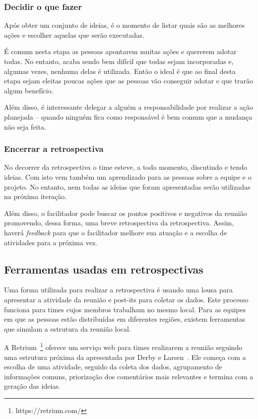 \subsubsection*{Decidir o que fazer}

Após obter um conjunto de ideias, é o momento de listar quais são as melhores ações e escolher aquelas que serão executadas.

É comum nesta etapa as pessoas apontarem muitas ações e quererem adotar todas. No entanto, acaba sendo bem difícil que todas sejam incorporadas e, algumas vezes, nenhuma delas é utilizada. Então o ideal é que ao final desta etapa sejam eleitas poucas ações que as pessoas vão conseguir adotar e que trarão algum benefício.

Além disso, é interessante delegar a alguém a responsabilidade por realizar a ação planejada -- quando ninguém fica como responsável é bem comum que a mudança não seja feita.

\subsubsection*{Encerrar a retrospectiva}

No decorrer da retrospectiva o time esteve, a todo momento, discutindo e tendo ideias. Com isto vem também um aprendizado para as pessoas sobre a equipe e o projeto. No entanto, nem todas as ideias que foram apresentadas serão utilizadas na próxima iteração.

Além disso, o facilitador pode  buscar os pontos positivos e negativos da reunião promovendo, dessa forma, uma breve retrospectiva da retrospectiva. Assim, haverá \textit{feedback} para que o facilitador melhore sua atuação e a escolha de atividades para a próxima vez.

\subsection{Ferramentas usadas em retrospectivas}

Uma forma utilizada para realizar a retrospectiva é usando uma lousa para apresentar a atividade da reunião e post-its para coletar os dados. Este processo funciona para times cujos membros trabalham no mesmo local. Para as equipes em que as pessoas estão distribuídas em diferentes regiões, existem ferramentas que simulam a estrutura da reunião local.

A Retrium~\footnote{https://retrium.com/} oferece um serviço web para times realizarem a reunião seguindo uma estrutura próxima da apresentada por Derby e Larsen~\cite{retrospectives}. Ele começa com a escolha de uma atividade, seguido da coleta dos dados, agrupamento de informações comuns, priorização dos comentários mais relevantes e termina com a geração das ideias.

